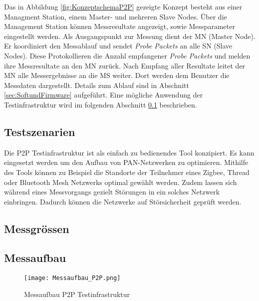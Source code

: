 Das in Abbildung \ref{fig:KonzeptschemaP2P} gezeigte Konzept besteht aus einer Managment Station, einem Master- und mehreren Slave Nodes. Über die Management Station können Messresultate angezeigt, sowie Messparameter eingestellt werden. Als Ausgangspunkt zur Messung dient der MN (Master Node). Er koordiniert den Messablauf und sendet \textit{Probe Packets} an alle SN (Slave Nodes). Diese Protokollieren die Anzahl empfangener \textit{Probe Packets} und melden ihre Messresultate an den MN zurück. Nach Empfang aller Resultate leitet der MN alle Messergebnisse an die MS weiter. Dort werden dem Benutzer die Messdaten dargestellt. Details zum Ablauf sind in Abschnitt \ref{sec:SoftundFirmware} aufgeführt. Eine mögliche Anwendung der Testinfrastruktur wird im folgenden Abschnitt \ref{sec:TestszenarienP2P} beschrieben.  

\subsection{Testszenarien}\label{sec:TestszenarienP2P}

Die P2P Testinfrastruktur ist als einfach zu bedienendes Tool konzipiert. Es kann eingesetzt werden um den Aufbau von PAN-Netzwerken zu optimieren. Mithilfe des Tools können zu Beispiel die Standorte der Teilnehmer eines Zigbee, Thread oder Bluetooth Mesh Netzwerks optimal gewählt werden. Zudem lassen sich während eines Messvorgangs gezielt Störungen in ein solches Netzwerk einbringen. Dadurch können die Netzwerke auf Störsicherheit geprüft werden. 



\subsection{Messgrössen}\label{sec:MessgrössenP2P}

\subsection{Messaufbau}\label{sec:Messaufbau}

\begin{figure} [H]
	\centering
	\texttt{[image: Messaufbau\_P2P.png]}
	\caption{Messaufbau P2P Testinfrastruktur}
	\label{fig:MessaufbauP2P}
\end{figure}

